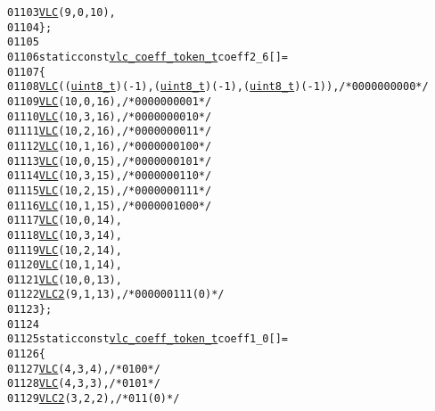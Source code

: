 \begin{footnotesize}
\begin{alltt}
01103         \hyperlink{vlc_8h_a7f3572774a720fd9b4bc3b1a0b65082f}{VLC}(9, 0, 10),
01104 \};
01105 
01106 \textcolor{keyword}{static} \textcolor{keyword}{const} \hyperlink{structvlc__coeff__token__t}{vlc_coeff_token_t} coeff2\_6[] = 
01107 \{
01108         \hyperlink{vlc_8h_a7f3572774a720fd9b4bc3b1a0b65082f}{VLC}((\hyperlink{_types_8h_a363e4d606232036a6b89060813c45489}{uint8_t})(-1), (\hyperlink{_types_8h_a363e4d606232036a6b89060813c45489}{uint8_t})(-1), (\hyperlink{_types_8h_a363e4d606232036a6b89060813c45489}{uint8_t})(-1)),   \textcolor{comment}{/* 0000 0000 00 */}
01109         \hyperlink{vlc_8h_a7f3572774a720fd9b4bc3b1a0b65082f}{VLC}(10, 0, 16),    \textcolor{comment}{/* 0000 0000 01 */}
01110         \hyperlink{vlc_8h_a7f3572774a720fd9b4bc3b1a0b65082f}{VLC}(10, 3, 16),    \textcolor{comment}{/* 0000 0000 10 */}
01111         \hyperlink{vlc_8h_a7f3572774a720fd9b4bc3b1a0b65082f}{VLC}(10, 2, 16),    \textcolor{comment}{/* 0000 0000 11 */}
01112         \hyperlink{vlc_8h_a7f3572774a720fd9b4bc3b1a0b65082f}{VLC}(10, 1, 16),    \textcolor{comment}{/* 0000 0001 00 */}
01113         \hyperlink{vlc_8h_a7f3572774a720fd9b4bc3b1a0b65082f}{VLC}(10, 0, 15),    \textcolor{comment}{/* 0000 0001 01 */}
01114         \hyperlink{vlc_8h_a7f3572774a720fd9b4bc3b1a0b65082f}{VLC}(10, 3, 15),    \textcolor{comment}{/* 0000 0001 10 */}
01115         \hyperlink{vlc_8h_a7f3572774a720fd9b4bc3b1a0b65082f}{VLC}(10, 2, 15),    \textcolor{comment}{/* 0000 0001 11 */}
01116         \hyperlink{vlc_8h_a7f3572774a720fd9b4bc3b1a0b65082f}{VLC}(10, 1, 15),    \textcolor{comment}{/* 0000 0010 00 */}
01117         \hyperlink{vlc_8h_a7f3572774a720fd9b4bc3b1a0b65082f}{VLC}(10, 0, 14),
01118         \hyperlink{vlc_8h_a7f3572774a720fd9b4bc3b1a0b65082f}{VLC}(10, 3, 14),
01119         \hyperlink{vlc_8h_a7f3572774a720fd9b4bc3b1a0b65082f}{VLC}(10, 2, 14),
01120         \hyperlink{vlc_8h_a7f3572774a720fd9b4bc3b1a0b65082f}{VLC}(10, 1, 14),
01121         \hyperlink{vlc_8h_a7f3572774a720fd9b4bc3b1a0b65082f}{VLC}(10, 0, 13),
01122         \hyperlink{vlc_8h_ad3cda36b9c6132357c7f7de5e52a6c93}{VLC2}(9, 1, 13),    \textcolor{comment}{/* 0000 0011 1(0) */}
01123 \};
01124 
01125 \textcolor{keyword}{static} \textcolor{keyword}{const} \hyperlink{structvlc__coeff__token__t}{vlc_coeff_token_t} coeff1\_0[] = 
01126 \{
01127         \hyperlink{vlc_8h_a7f3572774a720fd9b4bc3b1a0b65082f}{VLC}(4, 3, 4),  \textcolor{comment}{/* 0100 */}
01128         \hyperlink{vlc_8h_a7f3572774a720fd9b4bc3b1a0b65082f}{VLC}(4, 3, 3),  \textcolor{comment}{/* 0101 */}
01129         \hyperlink{vlc_8h_ad3cda36b9c6132357c7f7de5e52a6c93}{VLC2}(3, 2, 2), \textcolor{comment}{/* 011(0) */}

\end{alltt}
\end{footnotesize}
